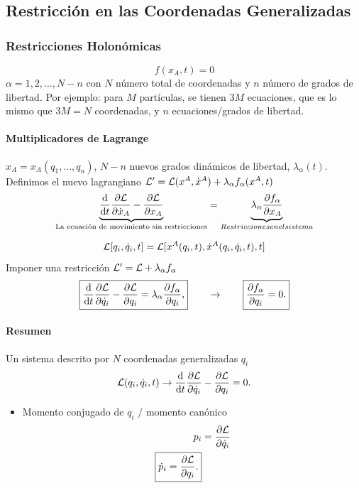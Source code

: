 \subsection{Restricción en las Coordenadas Generalizadas}

\subsubsection{Restricciones Holonómicas}
\begin{equation}
	f(x_A ,t) = 0
\end{equation}
$\alpha = 1,2,\ldots ,N-n$ con $N$ número total de coordenadas y $n$ número de grados de libertad. Por ejemplo: para $M$ partículas, se tienen $3M$ ecuaciones, que es lo mismo que $3M = N$ coordenadas, y $n$ ecuaciones/grados de libertad.
\paragraph{Multiplicadores de Lagrange} $x_A = x_A (q_1, \ldots ,q_n)$, $N - n$ nuevos grados dinámicos de libertad, $\lambda _\alpha (t)$. Definimos el nuevo lagrangiano $\mathcal{L} ^\prime = \mathcal{L} (x^A, \dot{x}^A) + \lambda _\alpha f_\alpha (x^A ,t)$
\begin{equation}
	\underbrace{\dv{t} \pdv{\mathcal{L}}{\dot{x}_A} - \pdv{\mathcal{L}}{x_A}}_{\text{La ecuación de movimiento sin restricciones}} = \underbrace{\lambda _\alpha \pdv{f_\alpha}{x_A}}_{Restricciones en el sistema}
\end{equation}

\begin{teorema}
	\begin{equation}
		\mathcal{L} [q_i, \dot{q}_i,t] = \mathcal{L} [x^A(q_i ,t), \dot{x}^A (q_i ,\dot{q}_i ,t),t]
	\end{equation}
	Imponer una restricción $\mathcal{L} ^\prime = \mathcal{L} + \lambda _\alpha f_\alpha$
	\begin{equation}
		\boxed{ \dv{t} \pdv{\mathcal{L}}{\dot{q}_i} - \pdv{\mathcal{L}}{q_i} = \lambda _\alpha \pdv{f_\alpha}{q_i}, } \qquad \to \qquad \boxed{ \pdv{f_\alpha}{q_i} = 0. }
	\end{equation}
\end{teorema}
\paragraph{Resumen} Un sistema descrito por $N$ coordenadas generalizadas $q_i$
\begin{align*}
	\mathcal{L} (q_i ,\dot{q}_i ,t) \to \dv{t} \pdv{\mathcal{L}}{\dot{q}_i} - \pdv{\mathcal{L}}{q_i} = 0.
\end{align*}
\begin{itemize}
	\item Momento conjugado de $q_i$ $/$ momento canónico
	\begin{align}
		p_i &= \pdv{\mathcal{L}}{\dot{q}_i} \\
		\boxed{ \dot{p}_i = \pdv{\mathcal{L}}{q_i}. }
	\end{align}
\end{itemize}

